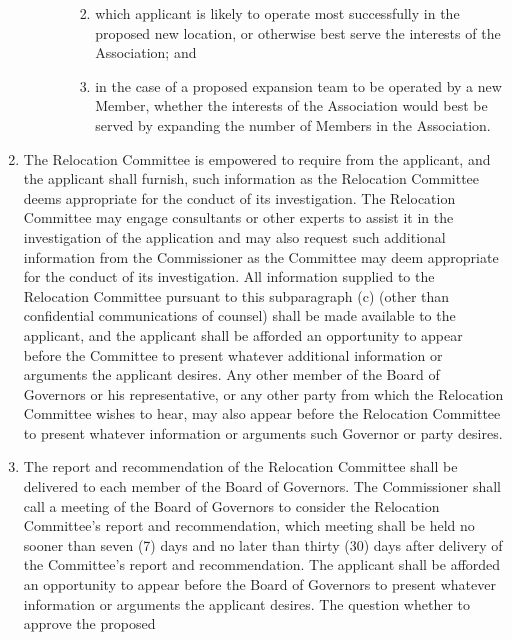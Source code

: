 \documentclass[]{book}
\providecommand{\tightlist}{%
  \setlength{\itemsep}{0pt}\setlength{\parskip}{0pt}}
\theoremstyle{definition}
\theoremstyle{definition}
\theoremstyle{definition}
\theoremstyle{remark}
\begin{document}
\begin{enumerate}
\begin{enumerate}
\begin{enumerate}
      \begin{enumerate}
      \def\labelenumiv{(\roman{enumiv})}
      \tightlist
      \item
        which applicant is likely to operate most successfully in the
        proposed new location, or otherwise best serve the interests of
        the Association; and
      \item
        in the case of a proposed expansion team to be operated by a new
        Member, whether the interests of the Association would best be
        served by expanding the number of Members in the Association.
      \end{enumerate}
    \end{enumerate}
  \end{enumerate}
\item
  The Relocation Committee is empowered to require from the applicant,
  and the applicant shall furnish, such information as the Relocation
  Committee deems appropriate for the conduct of its investigation. The
  Relocation Committee may engage consultants or other experts to assist
  it in the investigation of the application and may also request such
  additional information from the Commissioner as the Committee may deem
  appropriate for the conduct of its investigation. All information
  supplied to the Relocation Committee pursuant to this subparagraph (c)
  (other than confidential communications of counsel) shall be made
  available to the applicant, and the applicant shall be afforded an
  opportunity to appear before the Committee to present whatever
  additional information or arguments the applicant desires. Any other
  member of the Board of Governors or his representative, or any other
  party from which the Relocation Committee wishes to hear, may also
  appear before the Relocation Committee to present whatever information
  or arguments such Governor or party desires.
\item
  The report and recommendation of the Relocation Committee shall be
  delivered to each member of the Board of Governors. The Commissioner
  shall call a meeting of the Board of Governors to consider the
  Relocation Committee's report and recommendation, which meeting shall
  be held no sooner than seven (7) days and no later than thirty (30)
  days after delivery of the Committee's report and recommendation. The
  applicant shall be afforded an opportunity to appear before the Board
  of Governors to present whatever information or arguments the
  applicant desires. The question whether to approve the proposed

\end{enumerate}
\end{document}

